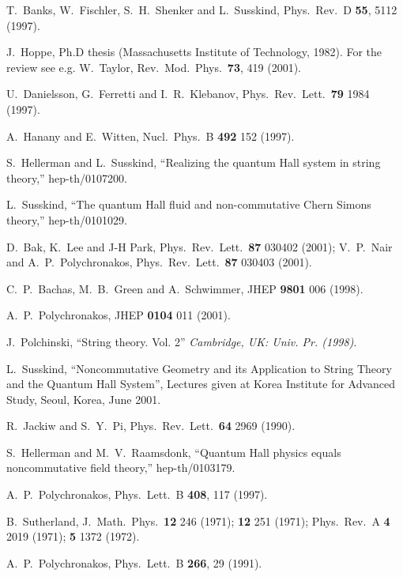 \documentclass[a4paper,12pt]{article}
\begin{document}
\begin{thebibliography}{99}

T.~Banks, W.~Fischler, S.~H.~Shenker and L.~Susskind, Phys.\ Rev.\ D {\bf 55}, 5112 (1997).

J.~Hoppe, Ph.D thesis (Massachusetts Institute of Technology, 1982). For  the review  see e.g. W.~Taylor, Rev.\
Mod.\ Phys.\  {\bf 73}, 419 (2001).



U.~Danielsson, G.~Ferretti and I.~R.~Klebanov, Phys.\ Rev.\ Lett.\  {\bf 79} 1984 (1997).

A.~Hanany and E.~Witten, Nucl.\ Phys.\ B {\bf 492} 152 (1997).

S.~Hellerman and L.~Susskind, ``Realizing the quantum Hall system in string theory,''  hep-th/0107200.

L.~Susskind, ``The quantum Hall fluid and non-commutative Chern Simons theory,''  hep-th/0101029.

D.~Bak, K.~Lee and J-H Park, Phys.\ Rev.\ Lett.\  {\bf 87} 030402 (2001);
V.~P.~Nair and A.~P.~Polychronakos,
Phys.\ Rev.\ Lett.\  {\bf 87}  030403 (2001).

C.~P.~Bachas, M.~B.~Green and A.~Schwimmer, JHEP {\bf 9801}  006 (1998).

A.~P.~Polychronakos, JHEP {\bf 0104} 011 (2001).

J.~Polchinski, ``String theory. Vol. 2'' {\it  Cambridge, UK: Univ. Pr. (1998)}.

L.~Susskind,  ``Noncommutative Geometry and its Application to String Theory and the Quantum Hall System'',
Lectures given at Korea Institute for Advanced Study, Seoul, Korea, June 2001.


R.~Jackiw and S.~Y.~Pi, Phys.\ Rev.\ Lett.\  {\bf 64}  2969 (1990).


S.~Hellerman and M.~V.~Raamsdonk, ``Quantum Hall physics equals noncommutative field theory,'' hep-th/0103179.


A.~P.~Polychronakos, Phys.\ Lett.\ B {\bf 408}, 117 (1997).

B.~Sutherland, J.\ Math.\ Phys.\ {\bf 12} 246 (1971); {\bf 12} 251 (1971);  Phys.\ Rev.\ A {\bf 4} 2019 (1971);
{\bf 5} 1372 (1972).


A.~P.~Polychronakos, Phys.\ Lett.\ B {\bf 266}, 29 (1991).



\end{thebibliography}


\end{document}

